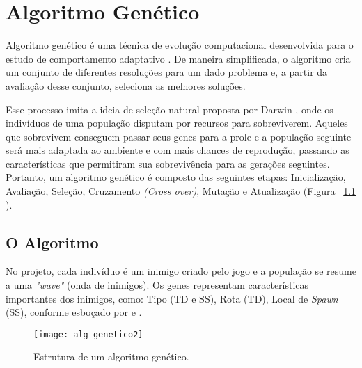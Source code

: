
\chapter{Algoritmo Genético}
\label{cap:algoritmo-genetico}

Algoritmo genético é uma técnica de evolução computacional desenvolvida para o estudo de comportamento adaptativo \citep{eiben15:introga}. De maneira simplificada, o algoritmo cria um conjunto de diferentes resoluções para um dado problema e, a partir da avaliação desse conjunto, seleciona as melhores soluções.

Esse processo imita a ideia de seleção natural proposta por Darwin \citep{eiben15:introga}, onde os indivíduos de uma população disputam por recursos para sobreviverem. Aqueles que sobrevivem conseguem passar seus genes para a prole e a população seguinte será mais adaptada ao ambiente e com mais chances de reprodução, passando as características que permitiram sua sobrevivência para as gerações seguintes. Portanto, um algoritmo genético é composto das seguintes etapas: Inicialização, Avaliação, Seleção, Cruzamento \textit{(Cross over)}, Mutação e Atualização (Figura ~\ref{fig:alg-genetico} ).

\section{O Algoritmo}
\label{sec:ag-algoritmo}

No projeto, cada indivíduo é um inimigo criado pelo jogo e a população se resume a uma \textit{"wave"} (onda de inimigos). Os genes representam características importantes dos inimigos, como: Tipo (TD e SS), Rota (TD), Local de \textit{Spawn} (SS), conforme esboçado por \citet{mallawaarachchi:gatutorial} e \citet{ahmed18:tutorialgapython}.

\begin{figure}
  \centering
  \texttt{[image: alg\_genetico2]}
  \caption{Estrutura de um algoritmo genético.\label{fig:alg-genetico}}
\end{figure}


